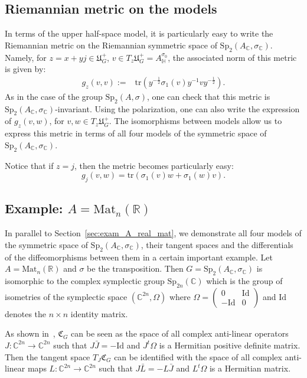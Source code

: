 \documentclass[oneside,11pt]{amsart}
\theoremstyle{definition}
\theoremstyle{remark}
\numberwithin{thm}{section}
\numberwithin{equation}{section}
\begin{document}
\subsection{Riemannian metric on the models}

In terms of the upper half-space model, it is particularly easy to write the Riemannian metric on the Riemannian symmetric space of $\mathrm{Sp}_2(A_\mathbb C,\sigma_\mathbb C)$. Namely, for $z=x+yj\in \mathfrak U^+_G$, $v\in T_z\mathfrak U^+_G=A^{\sigma_0}_\mathbb H$, the associated norm of this metric is given by:
\begin{align*}
    g_z(v,v):=&\mathrm{tr}\left(y^{-\frac{1}{2}}\sigma_1(v)y^{-1}vy^{-\frac{1}{2}}\right).    
\end{align*}
As in the case of the group $\mathrm{Sp}_2(A,\sigma)$, one can check that this metric is $\mathrm{Sp}_2(A_\mathbb C,\sigma_\mathbb C)$-invariant. Using the polarization, one can also write the expression of $g_z(v,w)$, for $v,w\in T_z\mathfrak U^+_G$. The isomorphisms between models allow us to express this metric in terms of all four models of the symmetric space of $\mathrm{Sp}_2(A_\mathbb C,\sigma_\mathbb C)$.

Notice that if $z=j$, then the metric becomes particularly easy: 
$$g_j(v,w)=\mathrm{tr}(\sigma_1(v)w+\sigma_1(w)v).$$


\subsection{Example: \texorpdfstring{$A=\mathrm{Mat}_n(\mathbb R)$}{}}
In parallel to Section~\ref{sec:exam_A_real_mat}, we demonstrate all four models of the symmetric space of $\mathrm{Sp}_2(A_\mathbb C,\sigma_\mathbb C)$, their tangent spaces and the differentials of the diffeomorphisms between them in a certain important example.
    Let $A=\mathrm{Mat}_n(\mathbb R)$ and $\sigma$ be the transposition. Then $G=\mathrm{Sp}_2(A_\mathbb C,\sigma_\mathbb C)$ is isomorphic to the complex symplectic group $\mathrm{Sp}_{2n}(\mathbb C)$ which is the group of isometries of the symplectic space $(\mathbb C^{2n}, \Omega)$ where $\Omega=\begin{pmatrix} 0 & \mathrm{Id} \\ -\mathrm{Id} & 0 \end{pmatrix}$ and $\mathrm{Id}$ denotes the $n\times n$ identity matrix.
    
    As shown in~\cite{ABRRW}, $\mathfrak{C}_G$ can be seen as the space of all complex anti-linear operators $J\colon \mathbb C^{2n}\to\mathbb C^{2n}$ such that $J\bar J=-\mathrm{Id}$ and $J^t\Omega$ is a Hermitian positive definite matrix. Then the tangent space $T_J\mathfrak{C}_G$ can be identified with the space of all complex anti-linear maps $L\colon \mathbb C^{2n}\to\mathbb C^{2n}$ such that $J\bar L=-L\bar J$ and $L^t\Omega$ is a Hermitian matrix.
\end{document}
